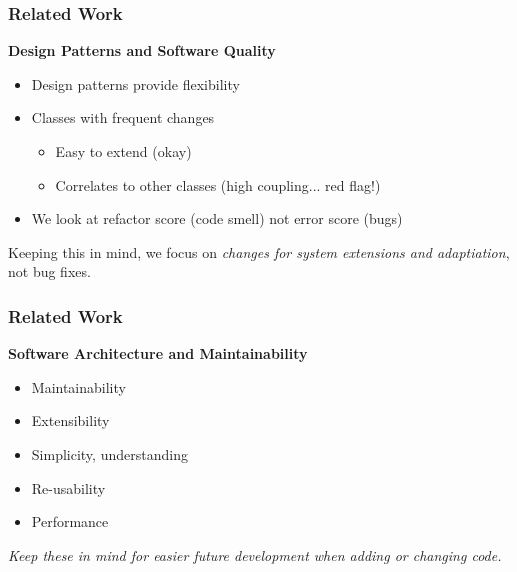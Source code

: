\documentclass{beamer}
\begin{document}
\begin{frame}
  \frametitle{Related Work}
  \textbf{Design Patterns and Software Quality}
  \begin{itemize}
    \vspace{0.35cm}
    \item Design patterns provide flexibility
    
    \vspace{0.35cm}
    \item Classes with frequent changes
    \begin{itemize}
      \item Easy to extend (okay)
      \item Correlates to other classes (high coupling... red flag!)
    \end{itemize}
    
    \vspace{0.35cm}
    \item We look at refactor score (code smell) not error score (bugs)
  \end{itemize}
  
  \vspace{0.35cm}
  Keeping this in mind, we focus on \emph{changes for system extensions and adaptiation}, not bug fixes.
\end{frame}

\begin{frame}
  \frametitle{Related Work}
  \textbf{Software Architecture and Maintainability}
  \begin{itemize}
    \vspace{0.35cm}
    \item Maintainability
    
    \vspace{0.35cm}
    \item Extensibility
    
    \vspace{0.35cm}
    \item Simplicity, understanding
    
    \vspace{0.35cm}
    \item Re-usability
    
    \vspace{0.35cm}
    \item Performance
  \end{itemize}

  \vspace{0.35cm}
  {\small \emph{Keep these in mind for easier future development when adding or changing code.}}
\end{frame}
\end{document}
